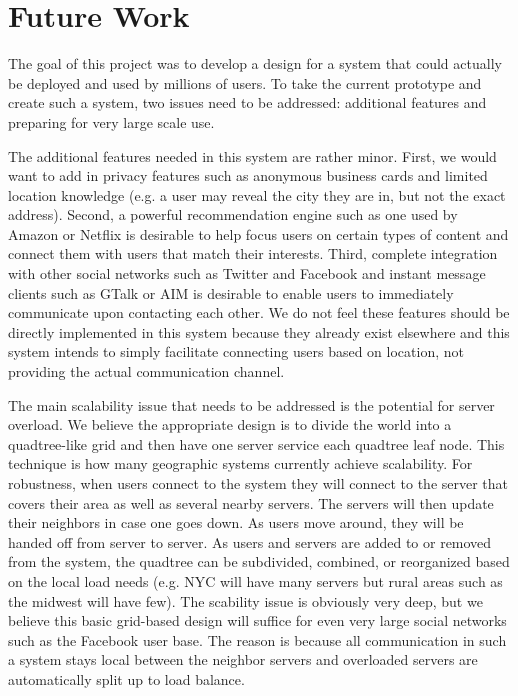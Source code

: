 \documentclass[11pt]{article}
\begin{document}
\section{Future Work}

The goal of this project was to develop a design for a system that could
actually be deployed and used by millions of users. To take the current 
prototype and create such a system, two issues need to be addressed:
additional features and preparing for very large scale use. 

The additional features needed in this system are rather minor. First,
we would want to add in privacy features such as anonymous business cards
and limited location knowledge (e.g. a user may reveal the city they
are in, but not the exact address). Second, a powerful recommendation
engine such as one used by Amazon or Netflix is desirable to help focus
users on certain types of content and connect them with users that match
their interests.  Third, complete integration with other social networks
such as Twitter and Facebook and instant message clients such as GTalk
or AIM is desirable to enable users to immediately communicate upon
contacting each other. We do not feel these features should be directly
implemented in this system because they already exist elsewhere and this
system intends to simply facilitate connecting users based on location,
not providing the actual communication channel.

The main scalability issue that needs to be addressed is the potential
for server overload. We believe the appropriate design is to divide
the world into a quadtree-like grid and then have one server service
each quadtree leaf node. This technique is how many geographic systems currently
achieve scalability.  For robustness, when users connect to the system
they will connect to the server that covers their area as well as several
nearby servers. The servers will then update their neighbors in case one
goes down. As users move around, they will be handed off from server to
server. As users and servers are added to or removed from the system, the quadtree
can be subdivided, combined, or reorganized based on the local load needs
(e.g. NYC will have many servers but rural areas such as the midwest will
have few). The scability issue is obviously very deep, but we believe this
basic grid-based design will suffice for even very large social networks
such as the Facebook user base. The reason is because all communication
in such a system stays local between the neighbor servers and overloaded
servers are automatically split up to load balance.
\end{document}
